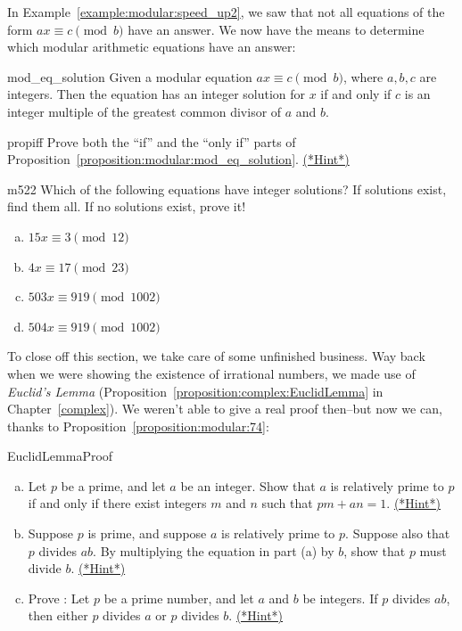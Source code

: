 In Example~\ref{example:modular:speed_up2}, we saw that not all equations of the form $ax \equiv c \pmod b$ have an answer.  We  now have the means to determine which modular arithmetic equations have an answer:

\begin{prop}{mod_eq_solution} 
Given a modular equation $ax \equiv c\pmod{b}$, where $a,b,c$ are  integers. Then the equation has an integer solution for $x$ if and only if $c$ is an integer multiple of the greatest common divisor of $a$ and $b$.  
\end{prop}

\begin{exercise}{propiff}
Prove both the ``if''  and the ``only if'' parts of Proposition~\ref{proposition:modular:mod_eq_solution}.
\hyperref[sec:modular_arithmetic:hints]{(*Hint*)}
\end{exercise}


\begin{exercise}{m522}
Which of the following equations have integer solutions? If solutions exist, find them all. If no solutions exist, prove it!
\begin{enumerate}[(a)]
\item
$15x \equiv 3 \pmod{12}$
\item
$4x \equiv 17 \pmod{23}$
\item
$503x \equiv 919 \pmod{1002}$
\item
$504x \equiv 919 \pmod{1002}$
\end{enumerate}

\end{exercise}

To close off this section, we take care of some unfinished business. Way back when we were showing the existence of irrational numbers, we made use of \emph{Euclid's Lemma} (Proposition~\ref{proposition:complex:EuclidLemma} in Chapter~\ref{complex}). We weren't able to give a real proof then--but now we can, thanks to Proposition~\ref{proposition:modular:74}:

\begin{exercise}{EuclidLemmaProof}
\begin{enumerate}[(a)]
\item
Let  $p$ be a prime, and let  $a$ be an integer.  Show that $a$ is relatively prime to $p$  if and only if there exist integers $m$ and $n$ such that $pm + an=1$.
\hyperref[sec:modular_arithmetic:hints]{(*Hint*)}
\item
Suppose $p$ is prime, and suppose $a$ is relatively prime to $p$.  Suppose also that $p$ divides $ab$. By multiplying the equation in part (a) by $b$, show that $p$ must divide $b$.
\hyperref[sec:modular_arithmetic:hints]{(*Hint*)}
\item
Prove :  Let $p$ be a prime number, and let $a$ and $b$ be integers. If $p$ divides $ab$, then either $p$ divides $a$ or $p$ divides $b$.
\hyperref[sec:modular_arithmetic:hints]{(*Hint*)}
\end{enumerate}
\end{exercise}


